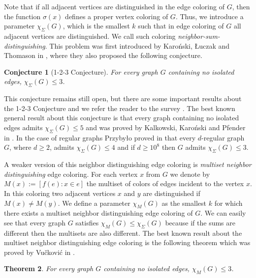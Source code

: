 \documentclass[12pt]{article}
\newtheorem{tw}{Theorem}
\newtheorem{cnj}[tw]{Conjecture}
\begin{document}
Note that if all adjacent vertices are distinguished in the edge coloring of $G$, then the function $\sigma (x)$ defines a proper vertex coloring of $G$. Thus, we introduce a parameter $\chi_{\Sigma}(G)$, which is the smallest $k$ such that in edge coloring of $G$ all adjacent vertices are distinguished. We call such coloring \textit{neighbor-sum-distinguishing}. This problem was first introduced by Karoński, Łuczak and Thomason in \cite{Karonski Luczak Thomason}, where they also proposed the following conjecture.  
\begin{cnj}[1-2-3 Conjecture]
For every graph $G$ containing no isolated edges, $\chi_{\Sigma}(G)\leq 3$.
\end{cnj}
This conjecture remains still open, but there are some important results about the 1-2-3 Conjecture and we refer the reader to the survey \cite{Seamone}. The best known general result about this conjecture is that every graph containing no isolated edges admits $\chi_{\Sigma}(G)\leq 5$ and was proved by Kalkowski, Karoński and Pfender in \cite{Kalkowski Karonski Pfender}. In the case of regular graphs Przybyło proved in \cite{Przybylo new} that every $d$-regular graph $G$, where $d\geq 2$, admits $\chi_{\Sigma}(G)\leq 4$ and if $d\geq 10^8$ then $G$ admits $\chi_{\Sigma}(G)\leq 3$.

A weaker version of this neighbor distinguishing edge coloring is  \textit{multiset neighbor distinguishing} edge coloring. For each vertex $x$ from $G$ we denote by $M(x):=[f(e): x \in e]$ the multiset of colors of edges incident to the vertex $x$.  In this coloring two adjacent vertices $x$ and $y$ are distinguished if $M(x)\neq M(y)$. We define a parameter $\chi_M(G)$ as the smallest $k$ for which there exists a multiset neighbor distinguishing edge coloring of $G$. We can easily see that every graph $G$ satisfies $\chi_M(G) \leq \chi_{\Sigma}(G)$ because if the sums are different then the multisets are also different. The best known result about the multiset neighbor distinguishing edge coloring is the following theorem which was proved by  Vu\v cković in \cite{Vuckovic}.
\begin{tw}
For every graph $G$ containing no isolated edges, $\chi_M(G)\leq 3$.
\end{tw}
\end{document}
